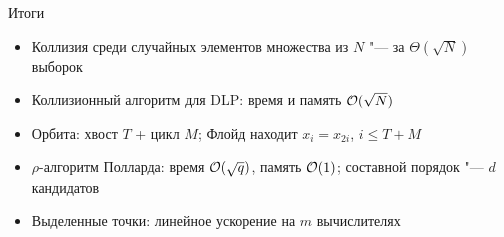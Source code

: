 \documentclass{ca-slides}
\begin{document}
\begin{canvasframe}{Итоги}
  \begin{itemize}
    \item Коллизия среди случайных элементов множества из $N$ "--- за $\Theta(\sqrt N)$
      выборок
    \item Коллизионный алгоритм для DLP: время и память $\mathcal{O}(\sqrt N)$
    \item Орбита: хвост $T$ + цикл $M$; Флойд находит $x_i = x_{2i}$, $i \le T + M$
    \item $\rho$-алгоритм Полларда: время $\mathcal{O}(\sqrt q)$, память $\mathcal{O}(1)$;
      составной порядок "--- $d$ кандидатов
    \item Выделенные точки: линейное ускорение на $m$ вычислителях
  \end{itemize}
\end{canvasframe}
\end{document}
